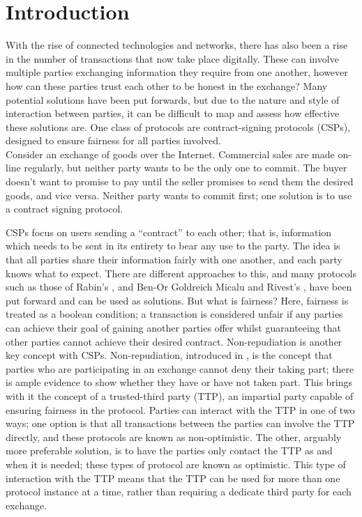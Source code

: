 \documentclass{l4proj}
\begin{document}
\chapter{Introduction}
With the rise of connected technologies and networks, there has also been a rise in the number of transactions that now take place digitally. These can involve multiple parties exchanging information they require from one another, however how can these parties trust each other to be honest in the exchange? Many potential solutions have been put forwards, but due to the nature and style of interaction between parties, it can be difficult to map and assess how effective these solutions are. One class of protocols are contract-signing protocols (CSPs), designed to ensure fairness for all parties involved.\\
Consider an exchange of goods over the Internet. Commercial sales are made on-line regularly, but neither party wants to be the only one to commit. The buyer doesn't want to promise to pay until the seller promises to send them the desired goods, and vice versa. Neither party wants to commit first; one solution is to use a contract signing protocol.

CSPs focus on users sending a “contract” to each other; that is, information which needs to be sent in its entirety to bear any use to the party. The idea is that all parties share their information fairly with one another, and each party knows what to expect. There are different approaches to this, and many protocols such as those of Rabin's \cite{rabin1983transaction}, and Ben-Or Goldreich Micalu and Rivest's \cite{ben1990fair}, have been put forward and can be used as solutions. But what is fairness? Here, fairness is treated as a boolean condition; a transaction is considered unfair if any parties can achieve their goal of gaining another parties offer whilst guaranteeing that other parties cannot achieve their desired contract. 
Non-repudiation is another key concept with CSPs.
Non-repudiation, introduced in \cite{jamroga2012fairness}, is the concept that parties who are participating in an exchange cannot deny their taking part; there is ample evidence to show whether they have or have not taken part. This brings with it the concept of a trusted-third party (TTP), an impartial party capable of ensuring fairness in the protocol. Parties can interact with the TTP in one of two ways; one option is that all transactions between the parties can involve the TTP directly, and these protocols are known as non-optimistic. The other, arguably more preferable solution, is to have the parties only contact the TTP as and when it is needed; these types of protocol are known as optimistic. This type of interaction with the TTP means that the TTP can be used for more than one protocol instance at a time, rather than requiring a dedicate third party for each exchange.
\end{document}
